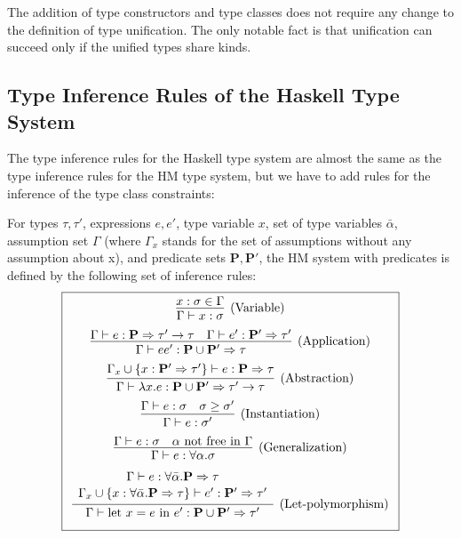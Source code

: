 The addition of type constructors and type classes does not require any change to the definition of type unification. The only notable fact is that unification can succeed only if the unified types share kinds.

\subsection{Type Inference Rules of the Haskell Type System}

The type inference rules for the Haskell type system are almost the same as the type inference rules for the HM type system, but we have to add rules for the inference of the type class constraints:

\begin{defn}
    For types $\tau, \tau'$, expressions $e, e'$, type variable $x$, set of type variables $\bar{\alpha}$, assumption set $\Gamma$ (where $\Gamma_x$ stands for the set of assumptions without any assumption about x), and predicate sets $\mathbf{P}, \mathbf{P'}$, the HM system with predicates is defined by the following set of inference rules:
    $$\boxed{\renewcommand{\arraystretch}{2.2}\begin{array}{cl}
        \infer[\text{(Variable)}]{\Gamma \vdash x : \sigma}{x : \sigma \in \Gamma} \\
        \infer[\text{(Application)}]{\Gamma \vdash e e' : \mathbf{P} \cup \mathbf{P'}  \Rightarrow \tau}{\Gamma \vdash e : \mathbf{P} \Rightarrow \tau' \rightarrow \tau & \Gamma \vdash e' : \mathbf{P'} \Rightarrow \tau'} \\
        \infer[\text{(Abstraction)}]{\Gamma \vdash \lambda x . e : \mathbf{P} \cup \mathbf{P'} \Rightarrow \tau' \rightarrow \tau}{\Gamma_x \cup \{x : \mathbf{P'} \Rightarrow \tau'\} \vdash e : \mathbf{P} \Rightarrow \tau} \\
        \infer[\text{(Instantiation)}]{\Gamma \vdash e : \sigma'}{\Gamma \vdash e : \sigma & \sigma \geq \sigma'}\\
        \infer[\text{(Generalization)}]{\Gamma \vdash e : \forall \alpha . \sigma}{\Gamma \vdash e : \sigma & \alpha \text{ not free in }\Gamma}\\
        \infer[\text{(Let-polymorphism)}]{\Gamma \vdash \text{let } x = e \text{ in } e' : \mathbf{P} \cup \mathbf{P'} \Rightarrow \tau'}{\renewcommand{\arraystretch}{1.1}\begin{array}{c}\Gamma \vdash e : \forall \bar{\alpha} . \mathbf{P} \Rightarrow \tau \\ \Gamma_x \cup \{x :\forall \bar{\alpha} .  \mathbf{P} \Rightarrow \tau \} \vdash e' : \mathbf{P'} \Rightarrow \tau'\end{array}}
    \end{array}}$$
\end{defn}

